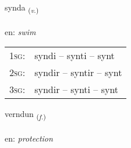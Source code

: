 \documentclass[frontgrid, backgrid]{flacards}\usepackage[]{graphicx}\usepackage[]{xcolor}
\begin{document}
\renewcommand{\flhead}{\vskip5pt \fboxsep=0pt {\small\bfseries\footnotesize Sagnorð | Verb}}
\renewcommand{\fcfoot}{\vskip5pt \fboxsep=0pt \hspace{2pt}{\small\bfseries\footnotesize 3K}}

\renewcommand{\blhead}{\vskip5pt {\small\bfseries\footnotesize Sagnorð | Verb }}
\renewcommand{\bcfoot}{\vskip5pt \hspace{2pt}{\small\bfseries\footnotesize 3K}}


{synda \small{\textsubscript{(\textit{v.})}} \\[1ex] %
\textphonetic{[sɪnta]} \\
en: \emph{swim} \\  [2ex]
\renewcommand*{\arraystretch}{0.8}
\begin{tabular}{p{1cm}l}
\textsc{1sg}: & syndi -- synti -- synt \\ 
\textsc{2sg}: & syndir -- syntir -- synt \\ 
\textsc{3sg}: & syndir -- synti -- synt \\ 
\end{tabular}
}

\renewcommand{\flhead}{\vskip5pt \fboxsep=0pt {\small\bfseries\footnotesize Nafnorð | Noun}}
\renewcommand{\fcfoot}{\vskip5pt \fboxsep=0pt \hspace{2pt}{\small\bfseries\footnotesize 3K}}

\renewcommand{\blhead}{\vskip5pt {\small\bfseries\footnotesize Nafnorð | Noun }}
\renewcommand{\bcfoot}{\vskip5pt \hspace{2pt}{\small\bfseries\footnotesize 3K}}


{verndun \small{\textsubscript{(\textit{f.})}} \\[1ex] %
\textphonetic{[vɛrntʏn]} \\
en: \emph{protection} \\  [2ex]
\renewcommand*{\arraystretch}{0.8}
}
\end{document}
